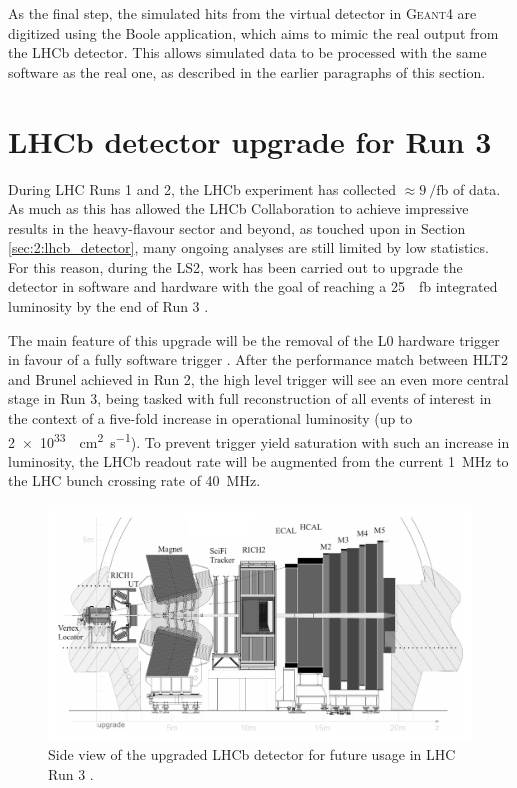 As the final step, the simulated hits from the virtual detector in \textsc{Geant4} are digitized using the Boole application, which aims to mimic the real output from the LHCb detector.
This allows simulated data to be processed with the same software as the real one, as described in the earlier paragraphs of this section.

\section{LHCb detector upgrade for Run 3}
\label{sec:2:upgrade}

During LHC Runs 1 and 2, the LHCb experiment has collected $\approx \SI{9}{\per\femto\barn}$ of data.
As much as this has allowed the LHCb Collaboration to achieve impressive results in the heavy-flavour sector and beyond, as touched upon in Section \ref{sec:2:lhcb_detector}, many ongoing analyses are still limited by low statistics.
For this reason, during the LS2, work has been carried out to upgrade the detector in software and hardware with the goal of reaching a \SI{25}{\per\femto\barn} integrated luminosity by the end of Run 3 \cite{Piucci_2017}.

The main feature of this upgrade will be the removal of the L0 hardware trigger in favour of a fully software trigger \cite{CERN-LHCC-2014-016}.
After the performance match between HLT2 and Brunel achieved in Run 2, the high level trigger will see an even more central stage in Run 3, being tasked with full reconstruction of all events of interest in the context of a five-fold increase in operational luminosity (up to \SI{2e33}{\per\centi\meter\squared\per\second}).
To prevent trigger yield saturation with such an increase in luminosity, the LHCb readout rate will be augmented from the current \SI{1}{\mega\hertz} to the LHC bunch crossing rate of \SI{40}{\mega\hertz}.

\begin{figure}[t]
	\centering
	\includegraphics[width=\textwidth]{graphics/02-lhcb/lhcb_diagram_run3.png}
	\caption[LHCb detector side view (Run 3).]{Side view of the upgraded LHCb detector for future usage in LHC Run 3 \cite{Piucci_2017}.}
	\label{fig:2:lhcb_diagram_run3}
\end{figure}

